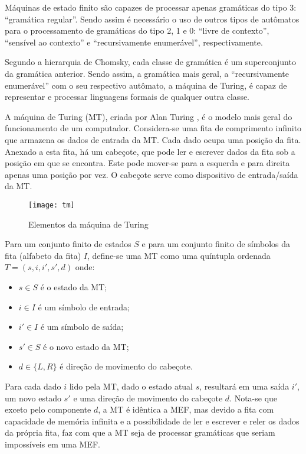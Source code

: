 Máquinas de estado finito são capazes de processar apenas gramáticas do tipo 3:
``gramática regular''. Sendo assim é necessário o uso de outros tipos de
autômatos para o processamento de gramáticas do tipo 2, 1 e 0: ``livre de
contexto'', ``sensível ao contexto'' e ``recursivamente enumerável'',
respectivamente.

Segundo a hierarquia de Chomsky, cada classe de gramática é um superconjunto da
gramática anterior. Sendo assim, a gramática mais geral, a ``recursivamente
enumerável'' com o seu respectivo autômato, a máquina de Turing, é capaz de
representar e processar linguagens formais de qualquer outra classe.

A máquina de Turing (MT), criada por Alan Turing \cite{turing}, é o modelo mais
geral do
funcionamento de um
computador. Considera-se uma fita de comprimento infinito que armazena os dados
de entrada da MT. Cada dado ocupa uma posição da fita. Anexado a esta fita, há
um cabeçote, que pode ler e escrever dados da fita sob a posição em que se
encontra. Este pode mover-se para a esquerda e para direita apenas uma posição
por vez. O cabeçote serve como dispositivo de entrada/saída da MT.

\begin{figure}[H]
    \centering
    \texttt{[image: tm]}
    \caption{Elementos da máquina de Turing}
    \label{fig:tm}
\end{figure}

Para um conjunto finito de estados $S$ e para um conjunto finito de símbolos da
fita (alfabeto da fita) $I$, define-se uma MT como uma quíntupla ordenada $T =
(s, i, i', s', d)$ onde:
\begin{itemize}
    \item $s \in S$ é o estado da MT;
    \item $i \in I$ é um símbolo de entrada;
    \item $i' \in I$ é um símbolo de saída;
    \item $s' \in S$ é o novo estado da MT;
    \item $d \in \{L,R\}$ é direção de movimento do cabeçote.
\end{itemize}

Para cada dado $i$ lido pela MT, dado o estado atual $s$, resultará em uma
saída $i'$, um novo estado $s'$ e uma direção de movimento do cabeçote $d$.
Nota-se que exceto pelo componente $d$, a MT é idêntica a MEF, mas devido a
fita com capacidade de memória infinita e a possibilidade de ler e escrever e
reler os dados da própria fita, faz com que a MT seja de processar gramáticas
que seriam impossíveis em uma MEF.

